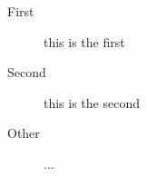 \begin{description}
\item[First] this is the first
\item[Second] this is the second 
\item[Other] ...
\end{description}
